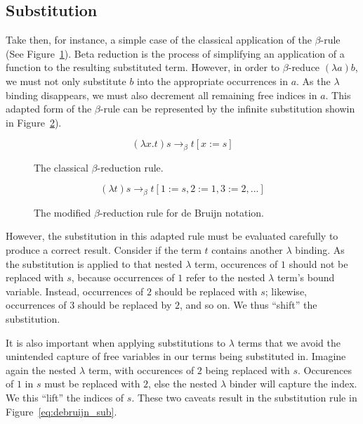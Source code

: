 \subsection{Substitution}
\label{sub:lambda_calc_subst}

Take then, for instance, a simple case of the classical application of the $\beta$-rule (See Figure~\ref{eq:beta_rule}). Beta reduction is the process of simplifying an application of a function to the resulting substituted term. However, in order to $\beta$-reduce $(\lambda a)b$, we must not only substitute $b$ into the appropriate occurrences in $a$. As the $\lambda$ binding disappears, we must also decrement all remaining free indices in $a$. This adapted form of the $\beta$-rule can be represented by the infinite substitution showin in Figure~\ref{eq:beta_rule2}).\cite{Abadi-Cardelli-Curien-Levy-1990}

\begin{figure}[h]
\begin{equation*}
(\lambda x.t)s \to_{\beta} t[x := s]
\end{equation*}
\caption{The classical $\beta$-reduction rule.}
\label{eq:beta_rule}
\end{figure}

\begin{figure}[h]
\begin{equation*}
(\lambda t)s \to_{\beta} t[1 := s, 2 := 1, 3 := 2, ...]
\end{equation*}
\caption{The modified $\beta$-reduction rule for de Bruijn notation.}
\label{eq:beta_rule2}
\end{figure}

However, the substitution in this adapted rule must be evaluated carefully to produce a correct result. Consider if the term $t$ contains another $\lambda$ binding. As the substitution is applied to that nested $\lambda$ term, occurences of $1$ should not be replaced with $s$, because occurrences of $1$ refer to the nested $\lambda$ term's bound variable. Instead, occurrences of $2$ should be replaced with $s$; likewise, occurrences of $3$ should be replaced by $2$, and so on. We thus ``shift'' the substitution.\cite{Abadi-Cardelli-Curien-Levy-1990}

It is also important when applying substitutions to $\lambda$ terms that we avoid the unintended capture of free variables in our terms being substituted in. Imagine again the nested $\lambda$ term, with occurences of $2$ being replaced with $s$. Occurences of $1$ in $s$ must be replaced with $2$, else the nested $\lambda$ binder will capture the index. We this ``lift'' the indices of $s$. These two caveats result in the substitution rule in Figure~\ref{eq:debruijn_sub}.\cite{Abadi-Cardelli-Curien-Levy-1990}

